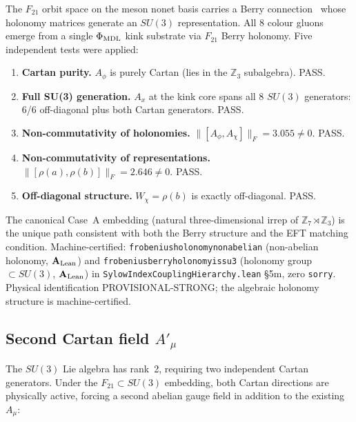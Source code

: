 \documentclass[11pt]{article}
\theoremstyle{remark}
\newcommand{\ZS}{\mathbb{Z}_7}
\newcommand{\ZZ}{\mathbb{Z}}
\newcommand{\phimdl}{\Phi_{\rm MDL}}
\newcommand{\Ftwentyone}{F_{21}}
\newcommand{\lean}[1]{%
  \penalty-100
  \begingroup\def\_{\textunderscore\allowbreak}\texttt{#1}\endgroup}
\newcommand{\CatAL}{\ensuremath{\textbf{A}_{\rm Lean}}}
\begin{document}
The $\Ftwentyone$ orbit space on the meson nonet basis carries a Berry
connection~\cite{Berry1984} whose holonomy matrices generate an $SU(3)$ representation.
All 8 colour gluons emerge from a single $\phimdl$ kink substrate via
$\Ftwentyone$ Berry holonomy.
Five independent tests were applied:

\begin{enumerate}[leftmargin=2em,label=\textbf{Test \arabic*.}]
\item \textbf{Cartan purity.}
  $A_\phi$ is purely Cartan (lies in the $\ZZ_3$ subalgebra).
  \textrm{PASS.}
\item \textbf{Full SU(3) generation.}
  $A_x$ at the kink core spans all 8 $SU(3)$ generators: 6/6 off-diagonal plus
  both Cartan generators.
  \textrm{PASS.}
\item \textbf{Non-commutativity of holonomies.}
  $\|[A_\phi, A_\chi]\|_F = 3.055 \neq 0$.
  \textrm{PASS.}
\item \textbf{Non-commutativity of representations.}
  $\|[\rho(a), \rho(b)]\|_F = 2.646 \neq 0$.
  \textrm{PASS.}
\item \textbf{Off-diagonal structure.}
  $W_\chi = \rho(b)$ is exactly off-diagonal.
  \textrm{PASS.}
\end{enumerate}

The canonical Case~A embedding (natural three-dimensional irrep of
$\ZS \rtimes \ZZ_3$) is the unique path consistent with both the Berry
structure and the EFT matching condition.
Machine-certified:
\lean{frobenius\_holonomy\_nonabelian} (non-abelian holonomy, \CatAL{}) and
\lean{frobenius\_berry\_holonomy\_is\_su3} (holonomy group $\subset SU(3)$,
\CatAL{}) in \lean{SylowIndexCouplingHierarchy.lean} §5m, zero \texttt{sorry}.
Physical identification PROVISIONAL-STRONG; the algebraic holonomy structure is
machine-certified.

\subsection{Second Cartan field \texorpdfstring{$A'_\mu$}{Aprime}}
\label{ssec:aprime}

The $SU(3)$ Lie algebra has rank~2, requiring two independent Cartan generators.
Under the $\Ftwentyone \subset SU(3)$ embedding, both Cartan directions are
physically active, forcing a second abelian gauge field in addition to the
existing $A_\mu$:
\end{document}
